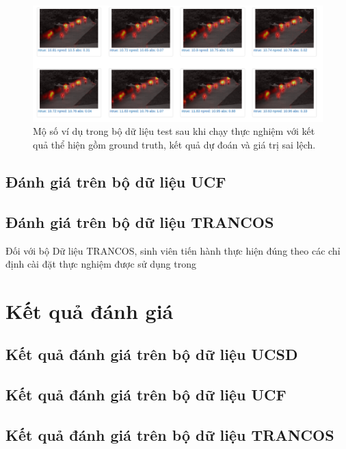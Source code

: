 \begin{figure}[ht]
  			\begin{center}
    				\includegraphics[scale=0.35]{ucsd} 
    				\caption{Mộ số ví dụ trong bộ dữ liệu test sau khi chạy thực nghiệm với kết quả thể hiện gồm ground truth, kết quả dự đoán và giá trị sai lệch.}
    				\label{ucsd}
  			\end{center}
\end{figure}	  
	

\subsection{Đánh giá trên bộ dữ liệu UCF} 
	
\subsection{Đánh giá trên bộ dữ liệu TRANCOS}
	Đối với bộ Dữ liệu TRANCOS, sinh viên tiến hành thực hiện đúng theo các chỉ định cài đặt thực nghiệm được sử dụng trong 
\section{Kết quả đánh giá}

\subsection{Kết quả đánh giá trên bộ dữ liệu UCSD}

\subsection{Kết quả đánh giá trên bộ dữ liệu UCF} 

\subsection{Kết quả đánh giá trên bộ dữ liệu TRANCOS}